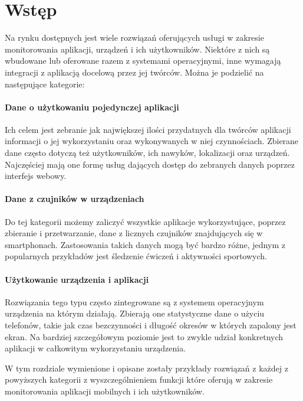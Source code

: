 \section{Wstęp}
Na rynku dostępnych jest wiele rozwiązań oferujących usługi w zakresie monitorowania aplikacji, urządzeń i ich użytkowników. Niektóre z nich są wbudowane lub oferowane razem z systemami operacyjnymi, inne wymagają integracji z aplikacją docelową przez jej twórców. Można je podzielić na następujące kategorie:

\paragraph{Dane o użytkowaniu pojedynczej aplikacji} 
Ich celem jest zebranie jak największej ilości przydatnych dla twórców aplikacji informacji o jej wykorzystaniu oraz wykonywanych w niej czynnościach. Zbierane dane często dotyczą też użytkowników, ich nawyków, lokalizacji oraz urządzeń. Najczęściej mają one formę usług dających dostęp do zebranych danych poprzez interfejs webowy. 

\paragraph{Dane z czujników w urządzeniach} 
Do tej kategorii możemy zaliczyć wszystkie aplikacje wykorzystujące, poprzez zbieranie i przetwarzanie, dane z licznych czujników znajdujących się w smartphonach. Zastosowania takich danych mogą być bardzo różne, jednym z popularnych przykładów jest śledzenie ćwiczeń i aktywności sportowych.

\paragraph{Użytkowanie urządzenia i aplikacji} 
Rozwiązania tego typu często zintegrowane są z systemem operacyjnym urządzenia na którym działają. Zbierają one statystyczne dane o użyciu telefonów, takie jak czas bezczynności i długość okresów w których zapalony jest ekran. Na bardziej szczegółowym poziomie jest to zwykle udział konkretnych aplikacji w całkowitym wykorzystaniu urządzenia.
\bigskip

W tym rozdziale wymienione i opisane zostały przykłady rozwiązań z każdej z powyższych kategorii z wyszczególnieniem funkcji które oferują w zakresie monitorowania aplikacji mobilnych i ich użytkowników.
